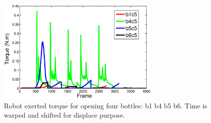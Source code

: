 \begin{figure}
  \centering
  \includegraphics[width=8cm]{./fig/rb1b4b5b6_time_T.eps}
  \caption{ \scriptsize{Robot exerted torque for opening four bottles: b1 b4 b5 b6. Time is warped and shifted for displace purpose.}
}
\label{fig:demo_b1b4b5b6}
\end{figure}




%
%
